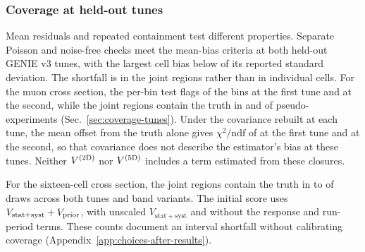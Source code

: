 \subsubsection{Coverage at held-out tunes}
\label{sec:closure-interval-diagnostics}

Mean residuals and repeated containment test different properties. Separate Poisson and noise-free checks meet the mean-bias criteria at both held-out GENIE v3 tunes, with the largest cell bias below  of its reported standard deviation. The shortfall is in the joint regions rather than in individual cells. For the muon cross section, the per-bin test flags  of the  bins at the first tune and  at the second, while the joint regions contain the truth in  and  of  pseudo-experiments (Sec.~\ref{sec:coverage-tunes}). Under the covariance rebuilt at each tune, the mean offset from the truth alone gives $\chi^2/\mathrm{ndf}$ of  at the first tune and  at the second, so that covariance does not describe the estimator's bias at these tunes. Neither $V^{(2\mathrm{D})}$ nor $V^{(5\mathrm{D})}$ includes a term estimated from these closures.

\label{sec:sixteen-cell-closure-tunes} For the sixteen-cell cross section, the joint regions contain the truth in  to  of  draws across both tunes and band variants. The initial score uses $V_{\mathrm{stat+syst}}+V_{\mathrm{prior}}$, with unscaled $V_{\mathrm{stat+syst}}$ and without the response and run-period terms. These counts document an interval shortfall without calibrating coverage (Appendix~\ref{app:choices-after-results}).


